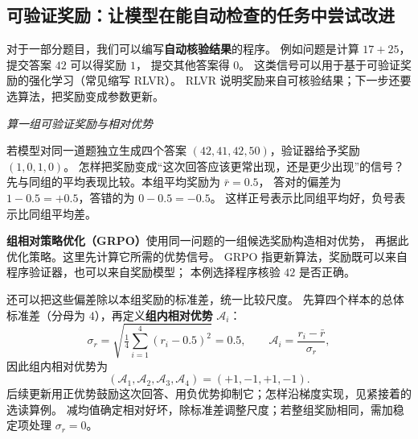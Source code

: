 \subsection{可验证奖励：让模型在能自动检查的任务中尝试改进}
\label{concept:rlvr}

对于一部分题目，我们可以编写\textbf{自动核验结果}的程序。
例如问题是计算 $17+25$，提交答案 $42$ 可以得奖励 $1$，
提交其他答案得 $0$。
这类信号可以用于基于可验证奖励的强化学习（常见缩写 RLVR）。
RLVR 说明奖励来自可核验结果；下一步还要选算法，把奖励变成参数更新。

\begin{center}
\end{center}

\begin{example}
\noindent\emph{算一组可验证奖励与相对优势}\par
若模型对同一道题独立生成四个答案 $(42,41,42,50)$，验证器给予奖励 $(1,0,1,0)$。
怎样把奖励变成“这次回答应该更常出现，还是更少出现”的信号？
先与同组的平均表现比较。本组平均奖励为 $\bar r=0.5$，
答对的偏差为 $1-0.5=+0.5$，答错的为 $0-0.5=-0.5$。
这样正号表示比同组平均好，负号表示比同组平均差。

\label{concept:grpo}
\textbf{组相对策略优化（GRPO）}使用同一问题的一组候选奖励构造相对优势，
再据此优化策略。这里先计算它所需的优势信号。
GRPO 指更新算法，奖励既可以来自程序验证器，也可以来自奖励模型；
本例选择程序核验 $42$ 是否正确。

还可以把这些偏差除以本组奖励的标准差，统一比较尺度。
先算四个样本的总体标准差（分母为 $4$），再定义\textbf{组内相对优势} $\mathcal A_i$：
\[
\sigma_r=\sqrt{\tfrac14\sum_{i=1}^4(r_i-0.5)^2}=0.5,
\qquad \mathcal A_i=\frac{r_i-\bar r}{\sigma_r},
\]
因此组内相对优势为
\[
(\mathcal A_1,\mathcal A_2,\mathcal A_3,\mathcal A_4)=\boxed{(+1,-1,+1,-1)}.
\]
后续更新用正优势鼓励这次回答、用负优势抑制它；怎样沿梯度实现，见紧接着的选读算例。
减均值确定相对好坏，除标准差调整尺度；若整组奖励相同，需加稳定项处理 $\sigma_r=0$。
\end{example}

